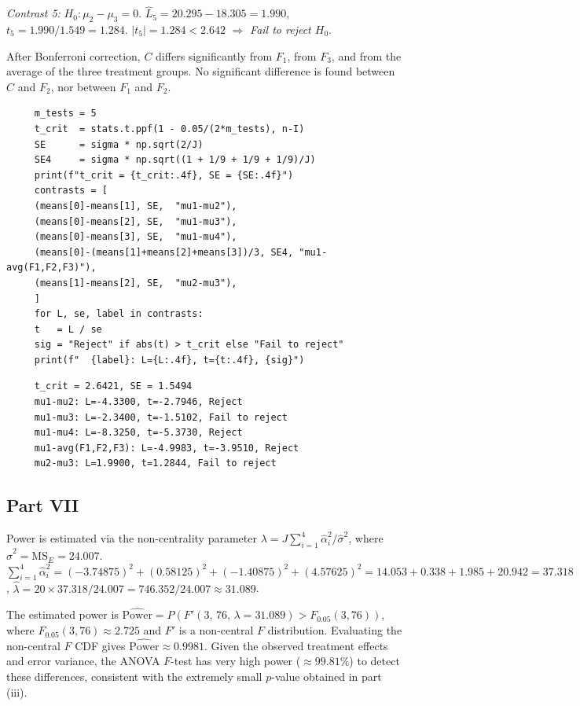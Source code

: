 \documentclass[letterpaper]{article}
\begin{document}
		\emph{Contrast 5:} $H_0: \mu_2 - \mu_3 = 0$.
		$\hat{L}_5 = 20.295 - 18.305 = 1.990$,
		$t_5 = 1.990/1.549 = 1.284$.
		$|t_5| = 1.284 < 2.642$ $\Rightarrow$ \emph{Fail to reject $H_0$}.
		
		After Bonferroni correction, $C$ differs significantly from $F_1$,
		from $F_3$, and from the average of the three treatment groups. No significant difference
		is found between $C$ and $F_2$, nor between $F_1$ and $F_2$.

\begin{lstlisting}
     m_tests = 5
     t_crit  = stats.t.ppf(1 - 0.05/(2*m_tests), n-I)
     SE      = sigma * np.sqrt(2/J)
     SE4     = sigma * np.sqrt((1 + 1/9 + 1/9 + 1/9)/J)
     print(f"t_crit = {t_crit:.4f}, SE = {SE:.4f}")
     contrasts = [
     (means[0]-means[1], SE,  "mu1-mu2"),
     (means[0]-means[2], SE,  "mu1-mu3"),
     (means[0]-means[3], SE,  "mu1-mu4"),
     (means[0]-(means[1]+means[2]+means[3])/3, SE4, "mu1-avg(F1,F2,F3)"),
     (means[1]-means[2], SE,  "mu2-mu3"),
     ]
     for L, se, label in contrasts:
     t   = L / se
     sig = "Reject" if abs(t) > t_crit else "Fail to reject"
     print(f"  {label}: L={L:.4f}, t={t:.4f}, {sig}")
\end{lstlisting}
		
 \begin{minipage}{\linewidth}
	\begin{Verbatim}
     t_crit = 2.6421, SE = 1.5494
     mu1-mu2: L=-4.3300, t=-2.7946, Reject
     mu1-mu3: L=-2.3400, t=-1.5102, Fail to reject
     mu1-mu4: L=-8.3250, t=-5.3730, Reject
     mu1-avg(F1,F2,F3): L=-4.9983, t=-3.9510, Reject
     mu2-mu3: L=1.9900, t=1.2844, Fail to reject
	\end{Verbatim}
\end{minipage}
		\clearpage
		\subsection{Part VII}
		
		Power is estimated via the non-centrality parameter
		$\lambda = J\sum_{i=1}^{4}\hat{\alpha}_i^2 / \hat{\sigma}^2$,
		where $\hat{\sigma}^2 = \mathrm{MS}_E = 24.007$.
		$\sum_{i=1}^{4}\hat{\alpha}_i^2
		= (-3.74875)^2 + (0.58125)^2 + (-1.40875)^2 + (4.57625)^2
		= 14.053 + 0.338 + 1.985 + 20.942 = 37.318$,
		$\hat{\lambda} = 20 \times 37.318 / 24.007 = 746.352 / 24.007 \approx 31.089$.
		
		The estimated power is
		$\widehat{\mathrm{Power}} = P(F'(3,\,76,\,\lambda = 31.089) > F_{0.05}(3,76))$,
		where $F_{0.05}(3,76) \approx 2.725$ and $F'$ is a non-central $F$ distribution.
		Evaluating the non-central $F$ CDF gives $\widehat{\mathrm{Power}} \approx 0.9981$.
		Given the observed treatment effects and error variance, the ANOVA
		$F$-test has very high power ($\approx 99.81\%$) to detect these differences,
		consistent with the extremely small $p$-value obtained in part (iii).
		
\end{document}
